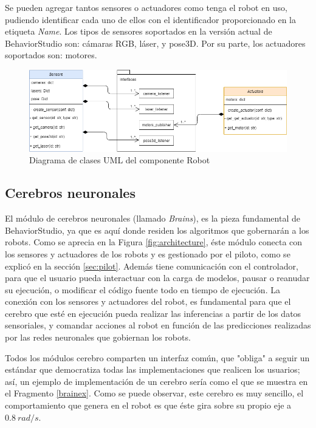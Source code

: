 Se pueden agregar tantos sensores o actuadores como tenga el robot en uso, pudiendo identificar cada uno de ellos con el identificador proporcionado en la etiqueta \textit{Name}. Los tipos de sensores soportados en la versión actual de BehaviorStudio son: cámaras RGB, láser, y pose3D. Por su parte, los actuadores soportados son: motores.

\begin{figure}
  \centering
  \includegraphics[width=1\linewidth]{img/robotuml}
  \caption{Diagrama de clases UML del componente Robot}
  \label{fig:robouml}
\end{figure}



\subsection{Cerebros neuronales}

El módulo de cerebros neuronales (llamado \textit{Brains}), es la pieza fundamental de BehaviorStudio, ya que es aquí donde residen los algoritmos que gobernarán a los robots. Como se aprecia en la Figura \ref{fig:architecture}, éste módulo conecta con los sensores y actuadores de los robots y es gestionado por el piloto, como se explicó en la sección \ref{sec:pilot}. Además tiene comunicación con el controlador, para que el usuario pueda interactuar con la carga de modelos, pausar o reanudar su ejecución, o modificar el código fuente todo en tiempo de ejecución. La conexión con los sensores y actuadores del robot, es fundamental para que el cerebro que esté en ejecución pueda realizar las inferencias a partir de los datos sensoriales, y comandar acciones al robot en función de las predicciones realizadas por las redes neuronales que gobiernan los robots.

Todos los módulos cerebro comparten un interfaz común, que "obliga" a seguir un estándar que democratiza todas las implementaciones que realicen los usuarios; así, un ejemplo de implementación de un cerebro sería como el que se muestra en el Fragmento \ref{brainex}. Como se puede observar, este cerebro es muy sencillo, el comportamiento que genera en el robot es que éste gira sobre su propio eje a $ 0.8\ rad/s $. 

